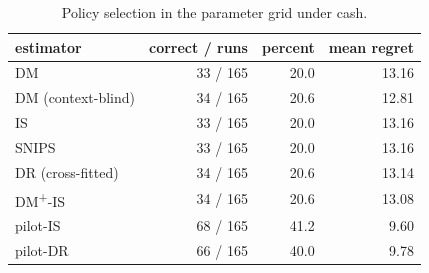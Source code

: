 \begin{table}[!htbp]
\centering
\caption{Policy selection in the parameter grid under cash.}
\label{tab:selection_cash}
\footnotesize
\begin{tabular}{lrrr}
\toprule
estimator & correct / runs & percent & mean regret \\
\midrule
DM & 33 / 165 & 20.0 & 13.16 \\
DM (context-blind) & 34 / 165 & 20.6 & 12.81 \\
IS & 33 / 165 & 20.0 & 13.16 \\
SNIPS & 33 / 165 & 20.0 & 13.16 \\
DR (cross-fitted) & 34 / 165 & 20.6 & 13.14 \\
DM\textsuperscript{+}-IS & 34 / 165 & 20.6 & 13.08 \\
pilot-IS & 68 / 165 & 41.2 & 9.60 \\
pilot-DR & 66 / 165 & 40.0 & 9.78 \\
\bottomrule
\end{tabular}
\end{table}
